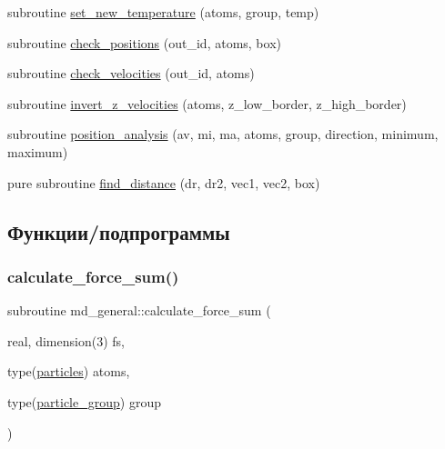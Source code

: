 \begin{DoxyCompactItemize}
\item 
subroutine \mbox{\hyperlink{namespacemd__general_a9f99fa4920c9047597f37b777dd44b3c}{set\+\_\+new\+\_\+temperature}} (atoms, group, temp)
\item 
subroutine \mbox{\hyperlink{namespacemd__general_ac9e62480edf60d2b3d1a123c9da68e1f}{check\+\_\+positions}} (out\+\_\+id, atoms, box)
\item 
subroutine \mbox{\hyperlink{namespacemd__general_abd425450c2140a07748c79f0f0dbd760}{check\+\_\+velocities}} (out\+\_\+id, atoms)
\item 
subroutine \mbox{\hyperlink{namespacemd__general_aca48dc12ea3fb99991acd82c2223a9bf}{invert\+\_\+z\+\_\+velocities}} (atoms, z\+\_\+low\+\_\+border, z\+\_\+high\+\_\+border)
\item 
subroutine \mbox{\hyperlink{namespacemd__general_a5dc45690a2125a86ce58d01601ebdf45}{position\+\_\+analysis}} (av, mi, ma, atoms, group, direction, minimum, maximum)
\item 
pure subroutine \mbox{\hyperlink{namespacemd__general_a33570f37733690b0634f039ad1bcf35e}{find\+\_\+distance}} (dr, dr2, vec1, vec2, box)
\end{DoxyCompactItemize}


\subsection{Функции/подпрограммы}
\mbox{\label{namespacemd__general_ac5733857b75ce71aa32a105751e4dfd5}} 
\subsubsection{\texorpdfstring{calculate\+\_\+force\+\_\+sum()}{calculate\_force\_sum()}}
{\footnotesize\ttfamily subroutine md\+\_\+general\+::calculate\+\_\+force\+\_\+sum (\begin{DoxyParamCaption}\item[{real, dimension(3)}]{fs,  }\item[{type(\mbox{\hyperlink{structmd__general_1_1particles}{particles}})}]{atoms,  }\item[{type(\mbox{\hyperlink{structmd__general_1_1particle__group}{particle\+\_\+group}})}]{group }\end{DoxyParamCaption})}



